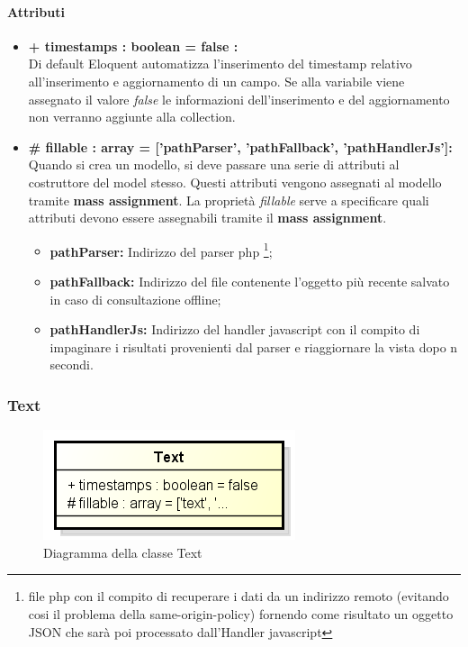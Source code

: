 	\paragraph{Attributi}
	\begin{itemize}
		\item \textbf{+ timestamps : boolean = false :}\\
		Di default Eloquent automatizza l'inserimento del timestamp relativo all'inserimento e aggiornamento di un campo. Se alla variabile viene assegnato il valore \textit{false} le informazioni dell'inserimento e del aggiornamento non verranno aggiunte alla collection.
		\item \textbf{\# fillable : array = ['pathParser’, ’pathFallback’, ’pathHandlerJs']:}\\
		Quando si crea un modello, si deve passare una serie di attributi al costruttore del model stesso. Questi attributi vengono assegnati al modello tramite \textbf{mass assignment}. La proprietà \textit{fillable} serve a specificare quali attributi devono essere assegnabili tramite il \textbf{mass assignment}.
		\begin{itemize}
			\item \textbf{pathParser:} Indirizzo del \gls{parser} \gls{php} \footnote{file \gls{php} con il compito di recuperare i dati da un indirizzo remoto (evitando cosi il problema della same-origin-policy) fornendo come risultato un oggetto \gls{JSON} che sarà poi processato dall'Handler \gls{javascript}};
			\item \textbf{pathFallback:} Indirizzo del file contenente l'oggetto più recente salvato in caso di consultazione offline;
			\item \textbf{pathHandlerJs:} Indirizzo del handler \gls{javascript} con il compito di impaginare i risultati provenienti dal \gls{parser} e riaggiornare la vista dopo n secondi.
		\end{itemize}
	\end{itemize}
\newpage


\subsubsection{Text}

	\begin{figure}[h]
		\centering
		\includegraphics[width=0.5\linewidth]{img/back_end_premi_model_text}
		\caption[Diagramma della classe Text]{Diagramma della classe Text}
		\label{fig:back_end_premi_model_text}
	\end{figure}


